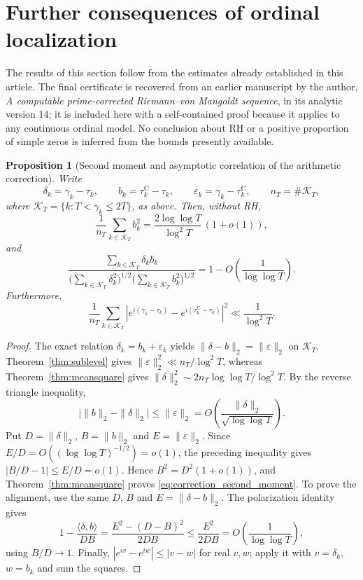 \documentclass[11pt,a4paper]{article}
\makeatletter
\numberwithin{equation}{section}
\DeclareRobustCommand{\CGref}[1]{\ref{#1}}
\DeclareRobustCommand{\CGeqref}[1]{\eqref{#1}}
\let\CG@origref\ref
\let\CG@origeqref\eqref
\newcommand{\CG@gettip}[1]{\@ifundefined{CGTip@#1}{#1}{\csname CGTip@#1\endcsname}}
\DeclareRobustCommand{\CGref}[1]{\pdftooltip{\CG@origref{#1}}{\CG@gettip{#1}}}
\DeclareRobustCommand{\CGeqref}[1]{\pdftooltip{\CG@origeqref{#1}}{\CG@gettip{#1}}}
\newtheorem{proposition}[theorem]{Proposition}
\theoremstyle{definition}
\theoremstyle{remark}
\makeatother
\begin{document}
\section{Further consequences of ordinal localization}\label{sec:additional}
The results of this section follow from the estimates already established in this article. The final certificate is recovered from an earlier manuscript by the author, \emph{A computable prime-corrected Riemann--von Mangoldt sequence}, in its analytic version 14; it is included here with a self-contained proof because it applies to any continuous ordinal model. No conclusion about RH or a positive proportion of simple zeros is inferred from the bounds presently available.

\begin{proposition}[Second moment and asymptotic correlation of the arithmetic correction]\label{prop:correction_second_moment}
Write
\[
\delta_k=\gamma_k-\tau_k,\qquad
b_k=\tau_k^{\mathrm C}-\tau_k,\qquad
\varepsilon_k=\gamma_k-\tau_k^{\mathrm C},\qquad
n_T=\#\mathcal K_T,
\]
where $\mathcal K_T=\{k:T<\gamma_k\le2T\}$, as above. Then, without RH,
\begin{equation}
\frac1{n_T}\sum_{k\in\mathcal K_T}b_k^2
=\frac{2\log\log T}{\log^2T}\,(1+o(1)),
\label{eq:correction_second_moment}
\end{equation}
and
\begin{equation}
\frac{\sum_{k\in\mathcal K_T}\delta_kb_k}
{\bigl(\sum_{k\in\mathcal K_T}\delta_k^2\bigr)^{1/2}
 \bigl(\sum_{k\in\mathcal K_T}b_k^2\bigr)^{1/2}}
=1-O\!\left(\frac1{\log\log T}\right).
\label{eq:correction_alignment}
\end{equation}
Furthermore,
\begin{equation}
\frac1{n_T}\sum_{k\in\mathcal K_T}
\left|e^{i(\gamma_k-\tau_k)}-e^{i(\tau_k^{\mathrm C}-\tau_k)}\right|^2
\ll\frac1{\log^2T}.
\label{eq:correction_phases}
\end{equation}
\end{proposition}
\begin{proof}
The exact relation $\delta_k=b_k+\varepsilon_k$ yields
$\|\delta-b\|_2=\|\varepsilon\|_2$ on $\mathcal K_T$.
Theorem~\CGref{thm:sublevel} gives
$\|\varepsilon\|_2^2\ll n_T/\log^2T$, whereas
Theorem~\CGref{thm:meansquare} gives
$\|\delta\|_2^2\sim2n_T\log\log T/\log^2T$.
By the reverse triangle inequality,
\[
\bigl|\|b\|_2-\|\delta\|_2\bigr|
\le\|\varepsilon\|_2
=O\!\left(\frac{\|\delta\|_2}{\sqrt{\log\log T}}\right).
\]
Put $D=\|\delta\|_2$, $B=\|b\|_2$ and $E=\|\varepsilon\|_2$. Since $E/D=O((\log\log T)^{-1/2})=o(1)$, the preceding inequality gives $|B/D-1|\le E/D=o(1)$. Hence $B^2=D^2(1+o(1))$, and Theorem~\CGref{thm:meansquare} proves \CGeqref{eq:correction_second_moment}.
To prove the alignment, use the same $D$, $B$ and $E=\|\delta-b\|_2$.
The polarization identity gives
\[
1-\frac{\langle\delta,b\rangle}{DB}
=\frac{E^2-(D-B)^2}{2DB}
\le\frac{E^2}{2DB}
=O\!\left(\frac1{\log\log T}\right),
\]
using $B/D\to1$.
Finally, $|e^{iv}-e^{iw}|\le|v-w|$ for real $v,w$; apply it with
$v=\delta_k$, $w=b_k$ and sum the squares.
\end{proof}
\end{document}
